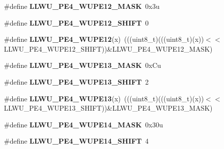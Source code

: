\begin{DoxyCompactItemize}
\item 
\#define {\bfseries L\+L\+W\+U\+\_\+\+P\+E4\+\_\+\+W\+U\+P\+E12\+\_\+\+M\+A\+SK}~0x3u\hypertarget{group__LLWU__Register__Masks_ga0d1b6351b58cc9fbf3099dc653754205}{}\label{group__LLWU__Register__Masks_ga0d1b6351b58cc9fbf3099dc653754205}

\item 
\#define {\bfseries L\+L\+W\+U\+\_\+\+P\+E4\+\_\+\+W\+U\+P\+E12\+\_\+\+S\+H\+I\+FT}~0\hypertarget{group__LLWU__Register__Masks_gaddb0a17347a85705dc2c2975129a7942}{}\label{group__LLWU__Register__Masks_gaddb0a17347a85705dc2c2975129a7942}

\item 
\#define {\bfseries L\+L\+W\+U\+\_\+\+P\+E4\+\_\+\+W\+U\+P\+E12}(x)~(((uint8\+\_\+t)(((uint8\+\_\+t)(x))$<$$<$L\+L\+W\+U\+\_\+\+P\+E4\+\_\+\+W\+U\+P\+E12\+\_\+\+S\+H\+I\+FT))\&L\+L\+W\+U\+\_\+\+P\+E4\+\_\+\+W\+U\+P\+E12\+\_\+\+M\+A\+SK)\hypertarget{group__LLWU__Register__Masks_ga433532e85a0db075b0e525c1483a27ad}{}\label{group__LLWU__Register__Masks_ga433532e85a0db075b0e525c1483a27ad}

\item 
\#define {\bfseries L\+L\+W\+U\+\_\+\+P\+E4\+\_\+\+W\+U\+P\+E13\+\_\+\+M\+A\+SK}~0x\+Cu\hypertarget{group__LLWU__Register__Masks_ga4d9218c37bd27ed586a5e73aa1b20a84}{}\label{group__LLWU__Register__Masks_ga4d9218c37bd27ed586a5e73aa1b20a84}

\item 
\#define {\bfseries L\+L\+W\+U\+\_\+\+P\+E4\+\_\+\+W\+U\+P\+E13\+\_\+\+S\+H\+I\+FT}~2\hypertarget{group__LLWU__Register__Masks_ga176680468b0cf75fbccc4a8be5d45388}{}\label{group__LLWU__Register__Masks_ga176680468b0cf75fbccc4a8be5d45388}

\item 
\#define {\bfseries L\+L\+W\+U\+\_\+\+P\+E4\+\_\+\+W\+U\+P\+E13}(x)~(((uint8\+\_\+t)(((uint8\+\_\+t)(x))$<$$<$L\+L\+W\+U\+\_\+\+P\+E4\+\_\+\+W\+U\+P\+E13\+\_\+\+S\+H\+I\+FT))\&L\+L\+W\+U\+\_\+\+P\+E4\+\_\+\+W\+U\+P\+E13\+\_\+\+M\+A\+SK)\hypertarget{group__LLWU__Register__Masks_ga0f97d1fbb1fd4c3be4a4641755e8b7a9}{}\label{group__LLWU__Register__Masks_ga0f97d1fbb1fd4c3be4a4641755e8b7a9}

\item 
\#define {\bfseries L\+L\+W\+U\+\_\+\+P\+E4\+\_\+\+W\+U\+P\+E14\+\_\+\+M\+A\+SK}~0x30u\hypertarget{group__LLWU__Register__Masks_gae3a1e7b7497f719cfebd559f31dc4d07}{}\label{group__LLWU__Register__Masks_gae3a1e7b7497f719cfebd559f31dc4d07}

\item 
\#define {\bfseries L\+L\+W\+U\+\_\+\+P\+E4\+\_\+\+W\+U\+P\+E14\+\_\+\+S\+H\+I\+FT}~4\hypertarget{group__LLWU__Register__Masks_ga1942d07f99eb5afb836650dcfb2185af}{}\label{group__LLWU__Register__Masks_ga1942d07f99eb5afb836650dcfb2185af}


\end{DoxyCompactItemize}
